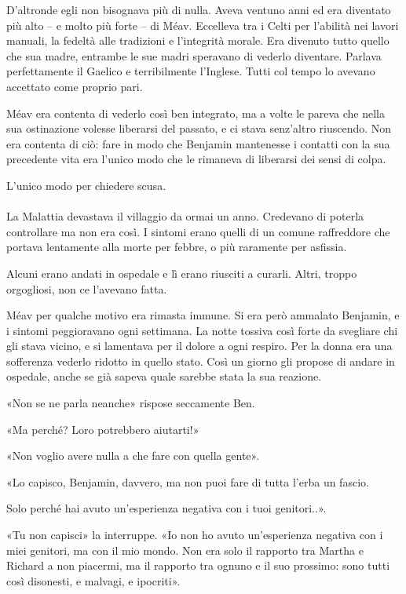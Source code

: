 \documentclass[a4paper,12pt]{book}
\begin{document}
D'altronde egli non bisognava più di nulla. Aveva ventuno anni ed era diventato
più alto -- e molto più forte -- di Méav. Eccelleva tra i Celti per
l'abilità nei lavori manuali, la fedeltà alle tradizioni e l'integrità
morale. Era divenuto tutto quello che sua madre, entrambe le sue madri speravano
di vederlo diventare. Parlava perfettamente il Gaelico e terribilmente
l'Inglese. Tutti col tempo lo avevano accettato come proprio pari.

Méav era contenta di vederlo così ben integrato, ma a volte le pareva che
nella sua ostinazione volesse liberarsi del passato, e ci stava senz'altro
riuscendo. Non era contenta di ciò: fare in modo che Benjamin mantenesse i
contatti con la sua precedente vita era l'unico modo che le rimaneva di
liberarsi dei sensi di colpa.

L'unico modo per chiedere scusa.

\paragraph{}
La Malattia devastava il villaggio da ormai un anno. Credevano di poterla
controllare ma non era così. I sintomi erano quelli di un comune raffreddore
che portava lentamente alla morte per febbre, o più raramente per asfissia.

Alcuni erano andati in ospedale e lì erano riusciti a curarli. Altri, troppo
orgogliosi, non ce l'avevano fatta.

Méav per qualche motivo era rimasta immune. Si era però ammalato Benjamin, e i
sintomi peggioravano ogni settimana. La notte tossiva così forte da svegliare
chi gli stava vicino, e si lamentava per il dolore a ogni respiro. Per la donna
era una sofferenza vederlo ridotto in quello stato. Così un giorno gli propose
di andare in ospedale, anche se già sapeva quale sarebbe stata la sua reazione.

«Non se ne parla neanche» rispose seccamente Ben.

«Ma perché? Loro potrebbero aiutarti!»

«Non voglio avere nulla a che fare con quella gente».

«Lo capisco, Benjamin, davvero, ma non puoi fare di tutta l'erba un fascio.

Solo perché hai avuto un'esperienza negativa con i tuoi genitori..».

«Tu non capisci» la interruppe. «Io non ho avuto un'esperienza negativa con i
miei genitori, ma con il mio mondo. Non era solo il rapporto tra Martha e
Richard a non piacermi, ma il rapporto tra ognuno e il suo prossimo: sono tutti
così disonesti, e malvagi, e ipocriti».
\end{document}
